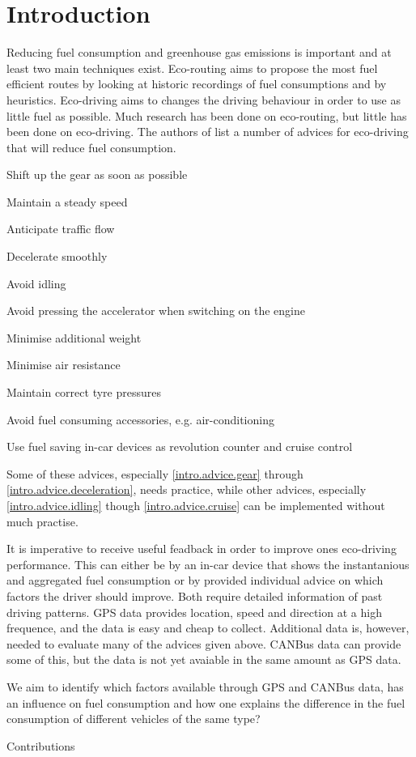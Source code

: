 \section{Introduction}

Reducing fuel consumption and greenhouse gas emissions is important and at least two main techniques exist.
Eco-routing aims to propose the most fuel efficient routes by looking at historic recordings of fuel consumptions and by heuristics.
Eco-driving aims to changes the driving behaviour in order to use as little fuel as possible.
Much research has been done on eco-routing\cite{}, %
but little has been done on eco-driving. %
The authors of \cite{EcodrivingAdvice} list a number of advices for eco-driving that will reduce fuel consumption. 
\begin{enumerate*}
\item Shift up the gear as soon as possible \label{intro.advice.gear}
\item Maintain a steady speed \label{intro.advice.speed}
\item Anticipate traffic flow \label{intro.advice.flow}
\item Decelerate smoothly \label{intro.advice.deceleration}
\item Avoid idling \label{intro.advice.idling}
\item Avoid pressing the accelerator when switching on the engine \label{intro.advice.accelerator}
\item Minimise additional weight \label{intro.advice.weight}
\item Minimise air resistance \label{intro.advice.air}
\item Maintain correct tyre pressures \label{intro.advice.tyre}
\item Avoid fuel consuming accessories, e.g. air-conditioning\label{intro.advice.accessories}
\item Use fuel saving in-car devices as revolution counter and cruise control \label{intro.advice.cruise}
\end{enumerate*}

Some of these advices, especially \ref{intro.advice.gear} through \ref{intro.advice.deceleration}, needs practice, while other advices, especially \ref{intro.advice.idling} though \ref{intro.advice.cruise} can be implemented without much practise. %

It is imperative to receive useful feadback in order to improve ones eco-driving performance.
This can either be by an in-car device that shows the instantanious and aggregated fuel consumption or by provided individual advice on which factors the driver should improve.
Both require detailed information of past driving patterns.
GPS data provides location, speed and direction at a high frequence, and the data is easy and cheap to collect.
Additional data is, however, needed to evaluate many of the advices given above.
CANBus data can provide some of this, but the data is not yet avaiable in the same amount as GPS data.

We aim to identify which factors available through GPS and CANBus data, has an influence on fuel consumption and how one explains the difference in the fuel consumption of different vehicles of the same type?

Contributions